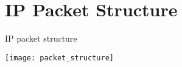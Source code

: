 \chapter{\ac{IP} Packet Structure}
\vspace{-.5in}
\label{chp:ip_packet}
\begin{table}
\caption{\ac{IP} packet structure}
\label{tbl:packet_structure}
\centering
\vspace{-1in}
\texttt{[image: packet\_structure]}
\end{table}

